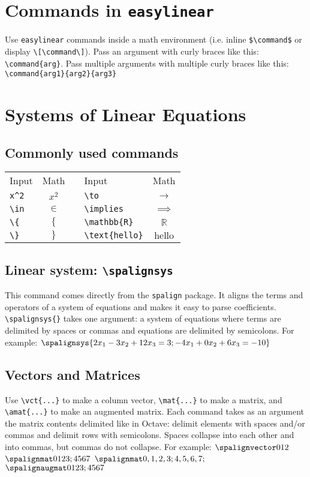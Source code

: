 \documentclass{article}
\begin{document}
\section{Commands in \texttt{easylinear}}
Use \texttt{easylinear} commands inside a math environment (i.e. inline \verb=$\command$= or display \verb=\[\command\]=). Pass an argument with curly braces like this: \verb=\command{arg}=. Pass multiple arguments with multiple curly braces like this: \verb=\command{arg1}{arg2}{arg3}=

\pagebreak
\section{Systems of Linear Equations}
\subsection{Commonly used commands}
\begin{tabular}{lcclc}
Input &  Math & \qquad \qquad & Input & Math\\
\verb|x^2| & $x^2$ & \qquad \qquad & \verb|\to| & $\to$ \\
\verb|\in| & $\in$ & \qquad \qquad & \verb|\implies| & $\implies$ \\
\verb|\{| & $\{$ & \qquad \qquad & \verb|\mathbb{R}| & $\mathbb{R}$ \\
\verb|\}| & $\}$ & \qquad \qquad & \verb|\text{hello}| & $\text{hello}$ \\
\end{tabular}

\subsection{Linear system: \texttt{\textbackslash spalignsys}}
This command comes directly from the \texttt{spalign} package. It aligns the terms and operators of a system of equations and makes it easy to parse coefficients. \verb=\spalignsys{}= takes one argument: a system of equations where terms are delimited by spaces or commas and equations are delimited by semicolons. For example:
\LTXexample[style=A]
$\spalignsys{2x_1 - 3x_2 + 12x_3 = 3; -4x_1 + 0x_2 + 6x_3 = -10}$
\endLTXexample

\subsection{Vectors and Matrices}
Use \verb=\vct{...}= to make a column vector, \verb=\mat{...}= to make a matrix, and \verb=\amat{...}= to make an augmented matrix. Each command takes as an argument the matrix contents delimited like in Octave: delimit elements with spaces and/or commas and delimit rows with semicolons. Spaces collapse into each other and into commas, but commas do not collapse. For example:
\LTXexample[style=A]
$\vct{0 1 2}$
\endLTXexample
\LTXexample[style=A]
$\mat{0 1 2 3; 4 5 6 7}$
\endLTXexample
\LTXexample[style=A]
$\mat{0,1 , 2 ,  3;4,5,6,7  ;}$
\endLTXexample
\LTXexample[style=A]
$\amat{0 1 2 3; 4 5 6 7}$
\endLTXexample
\end{document}
